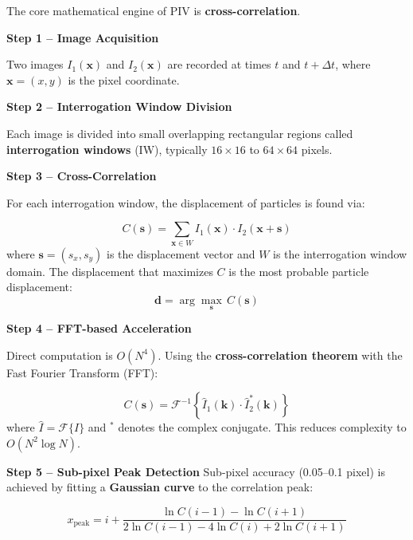 \documentclass[12pt,a4paper]{article}
\begin{document}
\begin{answerbox}
The core mathematical engine of PIV is \textbf{\color{accentpurple}cross-correlation}.

\vspace{0.5em}
\textbf{\color{deepblue}Step 1 -- Image Acquisition}

Two images $I_1(\mathbf{x})$ and $I_2(\mathbf{x})$ are recorded at times $t$ and $t + \Delta t$, where $\mathbf{x} = (x,y)$ is the pixel coordinate.

\vspace{0.5em}
\textbf{\color{deepblue}Step 2 -- Interrogation Window Division}

Each image is divided into small overlapping rectangular regions called \textbf{interrogation windows} (IW), typically $16 \times 16$ to $64 \times 64$ pixels.

\vspace{0.5em}
\textbf{\color{deepblue}Step 3 -- Cross-Correlation}

For each interrogation window, the displacement of particles is found via:
\begin{mathbox}
\begin{equation}
    C(\mathbf{s}) = \sum_{\mathbf{x} \in W} I_1(\mathbf{x}) \cdot I_2(\mathbf{x} + \mathbf{s})
\end{equation}
where $\mathbf{s} = (s_x, s_y)$ is the displacement vector and $W$ is the interrogation window domain. The displacement that maximizes $C$ is the most probable particle displacement:
\begin{equation}
    \mathbf{d} = \arg\max_{\mathbf{s}}\, C(\mathbf{s})
\end{equation}
\end{mathbox}

\vspace{0.5em}
\textbf{\color{deepblue}Step 4 -- FFT-based Acceleration}

Direct computation is $O(N^4)$. Using the \textbf{cross-correlation theorem} with the Fast Fourier Transform (FFT):
\begin{mathbox}
\begin{equation}
    C(\mathbf{s}) = \mathcal{F}^{-1}\!\left\{ \hat{I}_1(\mathbf{k}) \cdot \hat{I}_2^*(\mathbf{k}) \right\}
\end{equation}
where $\hat{I} = \mathcal{F}\{I\}$ and $^*$ denotes the complex conjugate. This reduces complexity to $O(N^2 \log N)$.
\end{mathbox}

\vspace{0.5em}
\textbf{\color{deepblue}Step 5 -- Sub-pixel Peak Detection}
Sub-pixel accuracy (0.05--0.1 pixel) is achieved by fitting a \textbf{Gaussian curve} to the correlation peak:
\begin{mathbox}
\begin{equation}
    x_{\text{peak}} = i + \frac{\ln C(i-1) - \ln C(i+1)}{2\ln C(i-1) - 4\ln C(i) + 2\ln C(i+1)}
\end{equation}
\end{mathbox}


\end{answerbox}
\end{document}
